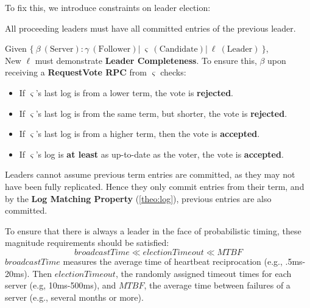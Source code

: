 \noindent
To fix this, we introduce constraints on leader election:

\begin{Def}

    All proceeding leaders must have all committed entries of the previous leader.
\end{Def}

\begin{Def}

    Given $\{\ \beta\ (\text{Server}): \gamma\ (\text{Follower})  |\ \varsigma\ (\text{Candidate}) |\ \ell\ (\text{Leader})\ \}$,\\
    New $\ell$ must demonstrate \textbf{Leader Completeness}. To ensure this, $\beta$ upon receiving a \textbf{RequestVote RPC} from $\varsigma$ checks:
    \begin{itemize}
        \item If $\varsigma$'s last log is from a lower term, the vote is \textbf{rejected}.
        \item If $\varsigma$'s last log is from the same term, but shorter, the vote is \textbf{rejected}.
        \item If $\varsigma$'s last log is from a higher term, then the vote is \textbf{accepted}.
        \item If $\varsigma$'s log is \textbf{at least} as up-to-date as the voter, the vote is \textbf{accepted}.
    \end{itemize}
\end{Def}

\begin{theo}

    Leaders cannot assume previous term entries are committed, as they may not have been fully replicated.
    Hence they only commit entries from their term, and by the \textbf{Log Matching Property} (\ref{theo:log}), previous entries are also committed.
\end{theo}

\begin{theo}

    To ensure that there is always a leader in the face of probabilistic timing, these 
    magnitude requirements should be satisfied:
    $$
    broadcastTime \ll electionTimeout \ll MTBF
    $$
    \noindent
    $broadcastTime$ measures the average time of heartbeat reciprocation (e.g., .5ms-20ms).
    Then $electionTimeout$, the randomly assigned timeout times for each server (e.g, 10ms-500ms), and $MTBF$, the
    average time between failures of a server (e.g., several months or more).
\end{theo}

